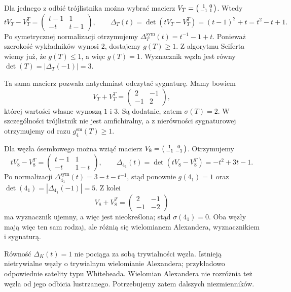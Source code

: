\begin{przyklad}
Dla jednego z odbić trójlistnika można wybrać macierz
$V_T=\begin{psmallmatrix}1&0\\-1&1\end{psmallmatrix}$. Wtedy
\[
tV_T-V_T^T=
\begin{pmatrix}t-1&1\\-t&t-1\end{pmatrix},
\qquad
\Delta_T(t)=\det(tV_T-V_T^T)=(t-1)^2+t=t^2-t+1.
\]
Po symetrycznej normalizacji otrzymujemy
$\Delta_T^{\mathrm{sym}}(t)=t^{-1}-1+t$.
Ponieważ szerokość wykładników wynosi $2$, dostajemy
$g(T)\ge 1$. Z algorytmu Seiferta wiemy już, że $g(T)\le 1$,
a więc $g(T)=1$. Wyznacznik węzła jest równy
$\det(T)=|\Delta_T(-1)|=3$.

Ta sama macierz pozwala natychmiast odczytać sygnaturę.
Mamy bowiem
\[
V_T+V_T^T=
\begin{pmatrix}2&-1\\-1&2\end{pmatrix},
\]
której wartości własne wynoszą $1$ i $3$. Są dodatnie,
zatem $\sigma(T)=2$. W szczególności trójlistnik nie jest
amfichiralny, a z nierówności sygnaturowej otrzymujemy od razu
$g_4^{\mathrm{sm}}(T)\ge 1$.

Dla węzła ósemkowego można wziąć macierz
$V_8=\begin{psmallmatrix}1&0\\-1&-1\end{psmallmatrix}$. Otrzymujemy
\[
tV_8-V_8^T=
\begin{pmatrix}t-1&1\\-t&1-t\end{pmatrix},
\qquad
\Delta_{4_1}(t)=\det(tV_8-V_8^T)=-t^2+3t-1.
\]
Po normalizacji
$\Delta_{4_1}^{\mathrm{sym}}(t)=3-t-t^{-1}$,
stąd ponownie $g(4_1)=1$ oraz
$\det(4_1)=|\Delta_{4_1}(-1)|=5$.
Z kolei
\[
V_8+V_8^T=
\begin{pmatrix}2&-1\\-1&-2\end{pmatrix}
\]
ma wyznacznik ujemny, a więc jest nieokreślona; stąd
$\sigma(4_1)=0$. Oba węzły mają więc ten sam rodzaj,
ale różnią się wielomianem Alexandera, wyznacznikiem i sygnaturą.
\end{przyklad}

\begin{uwaga}
Równość $\Delta_K(t)=1$ nie pociąga za sobą trywialności węzła.
Istnieją nietrywialne węzły o trywialnym wielomianie Alexandera;
przykładowo odpowiednie satelity typu Whiteheada. Wielomian
Alexandera nie rozróżnia też węzła od jego odbicia lustrzanego.
Potrzebujemy zatem dalszych niezmienników.
\end{uwaga}

